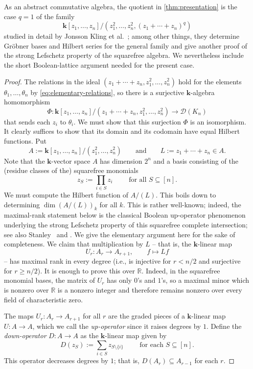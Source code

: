 \documentclass[12pt]{amsart}
\theoremstyle{definition}
\theoremstyle{remark}
\newcommand{\kk}{\mathbf{k}}
\begin{document}
As an abstract commutative algebra, the quotient in
\cref{thm:presentation} is the case $q=1$ of the family
\[
 \kk[z_1,\ldots,z_n]/
 (z_1^2,\ldots,z_n^2,(z_1+\cdots+z_n)^q)
\]
studied in detail by Jonsson Kling et al.~\cite{JKLMOS}; among other things,
they determine Gr\"obner bases and Hilbert series for the general family and
give another proof of the strong Lefschetz property of the squarefree
algebra.  We nevertheless include the short Boolean-lattice argument needed
for the present case.

\begin{proof}
The relations in the ideal $(z_1+\cdots+z_n,z_1^2,\ldots,z_n^2)$
hold for the elements $\theta_1,\ldots,\theta_n$ by
\eqref{eq:elementary-relations}, so there is a surjective
$\kk$-algebra homomorphism
\[
 \Phi : \kk[z_1,\ldots,z_n]/
 (z_1+\cdots+z_n,z_1^2,\ldots,z_n^2)
 \to \mathcal D(K_n)
\]
that sends each $z_i$ to $\theta_i$.
We must show that this surjection $\Phi$ is an isomorphism.
It clearly suffices to show that its domain and its codomain
have equal Hilbert functions.  Put
\[
 A:=\kk[z_1,\ldots,z_n]/(z_1^2,\ldots,z_n^2)
 \qquad\text{and}\qquad
 L:=z_1+\cdots+z_n \in A.
\]
Note that the $\kk$-vector space $A$ has dimension $2^n$
and a basis consisting of the (residue classes of the)
squarefree monomials
\[
z_S:=\prod_{i\in S}z_i
\qquad \text{ for all } S \subseteq [n].
\]
We must compute the Hilbert function of $A/(L)$.
This boils down to determining $\dim(A/(L))_k$ for all $k$.
This is rather well-known; indeed, the maximal-rank statement below is
the classical Boolean up-operator
phenomenon underlying the strong Lefschetz property of this squarefree
complete intersection; see also Stanley~\cite{StanleyLefschetz} and
\cite[\S3.1]{JKLMOS}.  We give the elementary argument here for the
sake of completeness.  We claim that
multiplication by $L$ -- that is, the $\kk$-linear map
\[
 U_r:A_r\longrightarrow A_{r+1},\qquad f\longmapsto Lf
\]
-- has maximal rank in every degree (i.e., is injective for $r < n/2$
and surjective for $r \geq n/2$).  It is enough to prove this over
$\mathbb R$.  Indeed, in the squarefree monomial bases, the matrix of $U_r$
has only $0$'s and $1$'s, so a maximal minor which is nonzero over
$\mathbb R$ is a nonzero integer and therefore remains nonzero over every
field of characteristic zero.

The maps $U_r : A_r \to A_{r+1}$ for all $r$ are the graded pieces of a
$\kk$-linear map $U : A \to A$, which we call the \emph{up-operator}
since it raises degrees by $1$.
Define the \emph{down-operator} $D : A \to A$ as the $\kk$-linear map
given by
\[
 D(z_S):=\sum_{i\in S}z_{S\setminus\{i\}}
 \qquad \text{ for each } S \subseteq [n].
\]
This operator decreases degrees by $1$; that is, $D (A_r) \subseteq
A_{r-1}$ for each $r$.


\end{proof}
\end{document}

